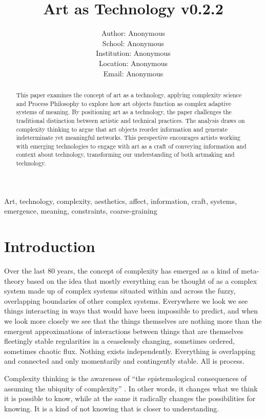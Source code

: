 \documentclass[letterpaper]{article}
\title{Art as Technology v0.2.2}
\author{Author: Anonymous\\
School: Anonymous\\
Institution: Anonymous\\
Location: Anonymous\\
Email: Anonymous\\
\newline
\newline
}
\begin{document}
 
\maketitle
\begin{abstract}

    This paper examines the concept of art as a technology, applying complexity science and Process Philosophy to explore how art objects function as complex adaptive systems of meaning. By positioning art as a technology, the paper challenges the traditional distinction between artistic and technical practices. The analysis draws on complexity thinking to argue that art objects reorder information and generate indeterminate yet meaningful networks. This perspective encourages artists working with emerging technologies to engage with art as a craft of conveying information and context about technology, transforming our understanding of both artmaking and technology.

\end{abstract}


Art, technology, complexity, aesthetics, affect, information, craft, systems, emergence, meaning, constraints, coarse-graining

\section{Introduction}

    Over the last 80 years, the concept of complexity has emerged as a kind of meta-theory based on the idea that mostly everything can be thought of as a complex system made up of complex systems situated within and across the fuzzy, overlapping boundaries of other complex systems. Everywhere we look we see things interacting in ways that would have been impossible to predict, and when we look more closely we see that the things themselves are nothing more than the emergent approximations of interactions between things that are themselves fleetingly stable regularities in a ceaselessly changing, sometimes ordered, sometimes chaotic flux. Nothing exists independently. Everything is overlapping and connected and only momentarily and contingently stable. All is process.
    
    Complexity thinking is the awareness of “the epistemological consequences of assuming the ubiquity of complexity” \citep{CilliersRichardsonCmplxtyScnc2001}. In other words, it changes what we think it is possible to know, while at the same it radically changes the possibilities for knowing. It is a kind of not knowing that is closer to understanding.
    
\end{document}
